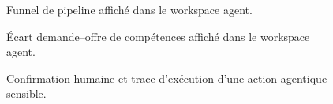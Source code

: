 \begin{figure}[H]
  \centering
  \caption{\label{fig:agent-pipeline-funnel}Funnel de pipeline affiché dans le workspace agent.}
\end{figure}

\begin{figure}[H]
  \centering
  \caption{\label{fig:agent-skill-gap}Écart demande--offre de compétences affiché dans le workspace agent.}
\end{figure}
\begin{figure}[H]
  \centering
  \caption{\label{fig:agent-confirmation-trace}Confirmation humaine et trace d'exécution d'une action agentique sensible.}
\end{figure}
